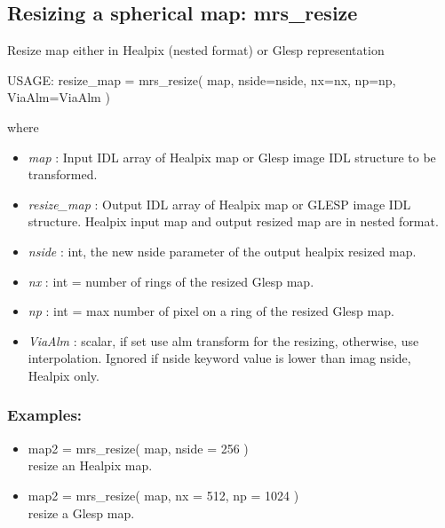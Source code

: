 \subsection{Resizing a spherical map: mrs\_resize}
Resize map either in Healpix (nested format) or Glesp representation
{\bf
\begin{center}
     USAGE: resize\_map = mrs\_resize( map, nside=nside, nx=nx, np=np, ViaAlm=ViaAlm )
\end{center}}
where
\begin{itemize}
\item {\em map} : Input IDL array of Healpix map or Glesp image IDL structure to be transformed.
\item {\em resize\_map} : Output IDL array of Healpix map or GLESP image IDL structure. Healpix input map and output resized map are in nested format.
\item {\em nside} : int, the new nside parameter of the output healpix resized map.
\item {\em nx} : int = number of rings of the resized Glesp map.
\item {\em np} : int = max number of pixel on a ring of the resized Glesp map.
\item {\em ViaAlm} : scalar, if set use alm transform for the resizing, otherwise, use interpolation. 
Ignored if nside keyword value is lower than imag nside, Healpix only.
\end{itemize}

\subsubsection*{Examples:} 
\begin{itemize}
\item map2 = mrs\_resize( map, nside = 256 ) \\
resize an Healpix map.
\item map2 = mrs\_resize( map, nx = 512, np = 1024 ) \\
resize a Glesp map.
\end{itemize}



